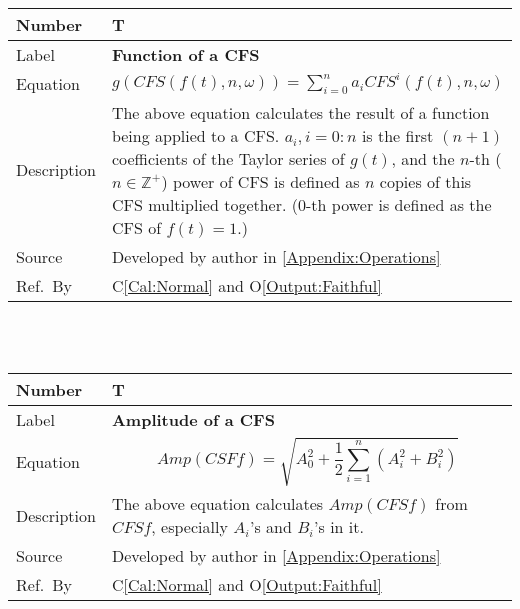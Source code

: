 \documentclass[12pt]{article}
\newcommand{\colAwidth}{0.13\textwidth}
\newcommand{\colBwidth}{0.82\textwidth}
\newcounter{theorynum} %
\newcommand{\calref}[1]{C\ref{#1}}
\newcommand{\oref}[1]{O\ref{#1}}
\begin{document}
~\newline
\noindent
\begin{minipage}{\textwidth}
	\renewcommand*{\arraystretch}{1.5}
	\begin{tabular}{| p{\colAwidth} | p{\colBwidth}|}
		\hline
		\rowcolor[gray]{0.9}
		Number& T{theorynum}\thetheorynum 
		\label{T:Function}\\
		\hline
		Label&\bf Function of a CFS\\
		\hline
		Equation&$g(\mathit{CFS}(f(t), n, \omega))=\sum_{i=0}^{n}a_i 
		\mathit{CFS}^i(f(t), n, \omega)$\\
		\hline
		Description & The above equation calculates the result of a function being applied to a CFS. $a_i, i=0:n$ is 
		the first $(n+1)$ coefficients of the Taylor series of $g(t)$, and 
		the $n$-th ($n\in\mathbb{Z}^{+}$) power of CFS is defined as $n$ 
		copies of this CFS multiplied together. ($0$-th power is defined 
		as the CFS of $f(t)=1$.)\\
		\hline
		Source & Developed by author in \autoref{Appendix:Operations}\\
		\hline
		Ref.\ By & \calref{Cal:Normal} and \oref{Output:Faithful}\\
		\hline
	\end{tabular}
\end{minipage}\\
~\newline

\noindent
\begin{minipage}{\textwidth}
	\renewcommand*{\arraystretch}{1.5}
	\begin{tabular}{| p{\colAwidth} | p{\colBwidth}|}
		\hline
		\rowcolor[gray]{0.9}
		Number& T{theorynum}\thetheorynum 
		\label{T:Amplitude}\\
		\hline
		Label&\bf Amplitude of a CFS\\
		\hline
		Equation&  
		\begin{equation}
		\mathit{Amp}(CSFf) = \sqrt{A_0^2+\frac{1}{2}
		\sum_{i=1}^{n}(A_i^2+B_i^2)}
		\end{equation}\\
		\hline
		Description & The above equation calculates $\mathit{Amp}
		(\mathit{CFSf})$  from $\mathit{CFSf}$, especially $A_i$'s 
		and $B_i$'s in it.\\
		\hline
		Source & Developed by author in \autoref{Appendix:Operations}\\
		\hline
		Ref.\ By & \calref{Cal:Normal} and \oref{Output:Faithful}\\
		\hline
	\end{tabular}
\end{minipage}\\
~\newline
\end{document}
